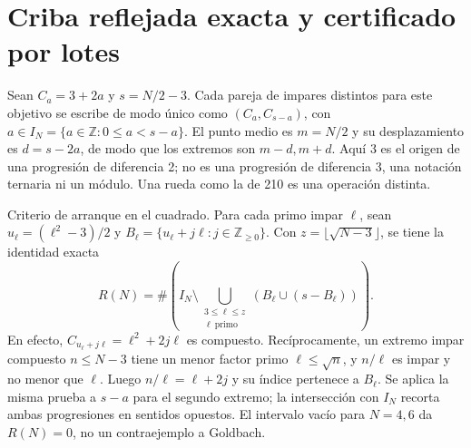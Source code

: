 \documentclass[11pt,a4paper]{article}
\newcommand{\B}[2]{#2}
\newcommand{\B}[2]{#1}
\newcommand{\Z}{\mathbb Z}
\begin{document}
\section{\B{An exact reflected sieve and batch certificate}{Criba reflejada exacta y certificado por lotes}}\label{sec:sieve}
\B{Put $C_a=3+2a$ and $s=N/2-3$. A distinct pair of odd integers at this target is uniquely $(C_a,C_{s-a})$ with $a\in I_N=\{a\in\Z:0\le a<s-a\}$. The midpoint is $m=N/2$ and its offset is $d=s-2a$, so the endpoints are $m-d,m+d$. Here $3$ is the origin of a progression of difference 2; it is neither a difference-3 progression, a ternary notation, nor a modulus. A wheel such as 210 is a separate operation.}{Sean $C_a=3+2a$ y $s=N/2-3$. Cada pareja de impares distintos para este objetivo se escribe de modo único como $(C_a,C_{s-a})$, con $a\in I_N=\{a\in\Z:0\le a<s-a\}$. El punto medio es $m=N/2$ y su desplazamiento es $d=s-2a$, de modo que los extremos son $m-d,m+d$. Aquí $3$ es el origen de una progresión de diferencia 2; no es una progresión de diferencia 3, una notación ternaria ni un módulo. Una rueda como la de 210 es una operación distinta.}

\B{Square-start criterion. For each odd prime $\ell$, set $u_\ell=(\ell^2-3)/2$ and $B_\ell=\{u_\ell+j\ell:j\in\Z_{\ge0}\}$. With $z=\lfloor\sqrt{N-3}\rfloor$, one has the exact identity}{Criterio de arranque en el cuadrado. Para cada primo impar $\ell$, sean $u_\ell=(\ell^2-3)/2$ y $B_\ell=\{u_\ell+j\ell:j\in\Z_{\ge0}\}$. Con $z=\lfloor\sqrt{N-3}\rfloor$, se tiene la identidad exacta}
\begin{equation}\label{eq:mark}
 R(N)=\#\left(I_N\setminus\bigcup_{\substack{3\le\ell\le z\\\ell\ \B{\mathrm{prime}}{\mathrm{primo}}}}\left(B_\ell\cup(s-B_\ell)\right)\right).
\end{equation}
\B{Indeed, $C_{u_\ell+j\ell}=\ell^2+2j\ell$ is composite. Conversely, an odd composite endpoint $n\le N-3$ has a least prime factor $\ell\le\sqrt n$, and $n/\ell$ is odd and at least $\ell$. Hence $n/\ell=\ell+2j$, so its index belongs to $B_\ell$. Apply the same proof to $s-a$ for the second endpoint; intersection with $I_N$ clips the two progressions in opposite directions. The empty interval at $N=4,6$ gives $R(N)=0$, not a counterexample to Goldbach.}{En efecto, $C_{u_\ell+j\ell}=\ell^2+2j\ell$ es compuesto. Recíprocamente, un extremo impar compuesto $n\le N-3$ tiene un menor factor primo $\ell\le\sqrt n$, y $n/\ell$ es impar y no menor que $\ell$. Luego $n/\ell=\ell+2j$ y su índice pertenece a $B_\ell$. Se aplica la misma prueba a $s-a$ para el segundo extremo; la intersección con $I_N$ recorta ambas progresiones en sentidos opuestos. El intervalo vacío para $N=4,6$ da $R(N)=0$, no un contraejemplo a Goldbach.}
\end{document}
